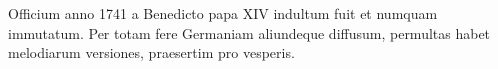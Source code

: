 Officium anno 1741 a Benedicto papa XIV indultum fuit et
numquam %
immutatum.
Per totam fere Germaniam aliundeque diffusum, permultas habet
melodiarum versiones, praesertim pro vesperis.
